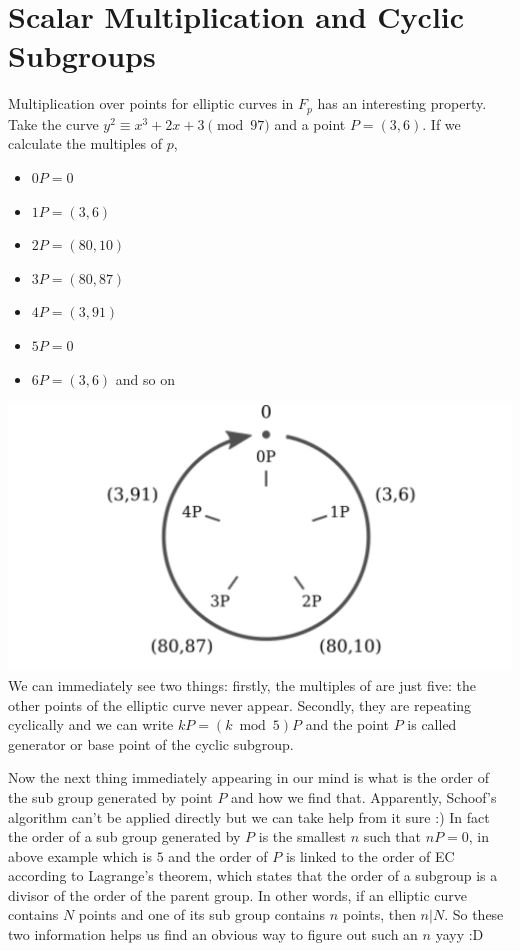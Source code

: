 \documentclass{article}
\begin{document}
\section{Scalar Multiplication and Cyclic Subgroups}
Multiplication over points for elliptic curves in $F_p$ has an interesting property. Take the curve $y^2 \equiv x^3 + 2x + 3 \pmod{97}$ and a point $P=(3,6)$. If we calculate the multiples of $p$, 
\begin{itemize}
    \item $0P=0$
    \item $1P=(3,6)$
    \item $2P=(80,10)$
    \item $3P=(80,87)$
    \item $4P=(3,91)$
    \item $5P=0$
    \item $6P=(3,6)$ and so on
\end{itemize}
    \includegraphics[scale=0.8]{add2.PNG}\\
We can immediately see two things: firstly, the multiples of  are just five: the other points of the elliptic curve never appear. Secondly, they are repeating cyclically and we can write $kP = (k \bmod{5})P$ and the point $P$ is called generator or base point of the cyclic subgroup.

Now the next thing immediately appearing in our mind is what is the order of the sub group generated by point $P$ and how we find that. Apparently, Schoof's algorithm can't be applied directly but we can take help from it sure :) In fact the order of a sub group generated by $P$ is the smallest $n$ such that $nP=0$, in above example which is $5$ and the order of $P$ is linked to the order of EC according to Lagrange's theorem, which states that the order of a subgroup is a divisor of the order of the parent group. In other words, if an elliptic curve contains $N$ points and one of its sub group contains $n$ points, then $n|N$. So these two information helps us find an obvious way to figure out such an $n$ yayy :D 
\end{document}
